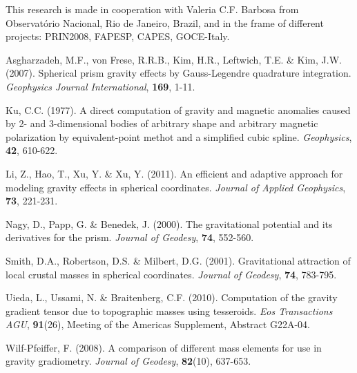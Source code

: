 \documentclass[a4paper,twocolumn]{esapub2005} %
\begin{document}
This research is made in cooperation with Valeria C.F. Barbosa from Observat\'orio
Nacional, Rio de Janeiro, Brazil, and in the frame of different projects:
PRIN2008, FAPESP, CAPES, GOCE-Italy.

\begin{thebibliography}{}

 Asgharzadeh, M.F., von Frese, R.R.B., Kim, H.R., Leftwich, T.E. \& Kim, J.W. (2007).
 Spherical prism gravity ef\mbox{}fects by Gauss-Legendre quadrature integration.
 \textit{Geophysics Journal International}, \textbf{169}, 1-11.

  Ku, C.C. (1977). A direct computation of gravity and magnetic
 anomalies caused by 2- and 3-dimensional bodies of arbitrary shape and arbitrary
 magnetic polarization by equivalent-point methot and a simplified cubic spline.
 \textit{Geophysics}, \textbf{42}, 610-622.

  Li, Z., Hao, T., Xu, Y. \& Xu, Y. (2011).
 An efficient and adaptive approach for modeling gravity effects in spherical coordinates.
 \textit{Journal of Applied Geophysics}, \textbf{73}, 221-231.

  Nagy, D., Papp, G. \& Benedek, J. (2000).
 The gravitational potential and its derivatives for the prism.
 \textit{Journal of Geodesy}, \textbf{74}, 552-560.

  Smith, D.A., Robertson, D.S. \& Milbert, D.G.
 (2001). Gravitational attraction of local crustal masses in spherical coordinates.
 \textit{Journal of Geodesy}, \textbf{74}, 783-795.

  Uieda, L., Ussami, N. \& Braitenberg, C.F. (2010).
 Computation of the gravity gradient tensor due to topographic masses using tesseroids.
 \textit{Eos Transactions AGU}, \textbf{91}(26), Meeting of the Americas Supplement,
 Abstract G22A-04.

  Wilf-Pfeif\mbox{}fer, F. (2008).
 A comparison of different mass elements for use in gravity gradiometry.
 \textit{Journal of Geodesy}, \textbf{82}(10), 637-653.

\end{thebibliography}
\end{document}
